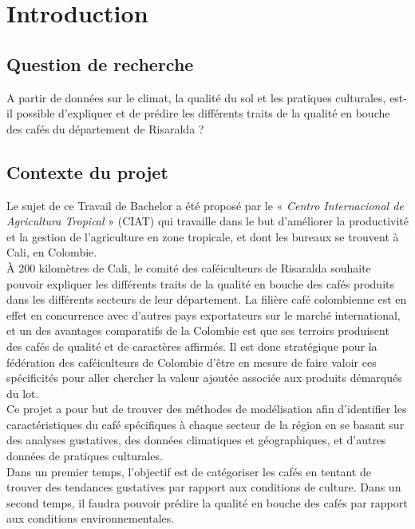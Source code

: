 
\chapter{Introduction}
\section{Question de recherche}

A partir de données sur le climat, la qualité du sol et les pratiques culturales, est-il possible d’expliquer et de prédire les différents traits de la qualité en bouche des cafés du département de Risaralda ?


\section{Contexte du projet}
Le sujet de ce Travail de Bachelor a été proposé par le « \textit{Centro Internacional de Agricultura Tropical }» (CIAT) qui travaille dans le but d’améliorer la productivité et la gestion de l’agriculture en zone tropicale, et dont les bureaux se trouvent à Cali, en Colombie.\\

\noindent À 200 kilomètres de Cali, le comité des caféiculteurs de Risaralda souhaite pouvoir expliquer les différents traits de la qualité en bouche des cafés produits dans les différents secteurs de leur département. La filière café colombienne est en effet en concurrence avec d’autres pays exportateurs sur le marché international, et un des avantages comparatifs de la Colombie est que ses terroirs produisent des cafés de qualité et de caractères affirmés. Il est donc stratégique pour la fédération des caféiculteurs de Colombie d'être en mesure de faire valoir ces spécificités pour aller chercher la valeur ajoutée associée aux produits démarqués du lot.\\


\noindent Ce projet a pour but de trouver des méthodes de modélisation afin d’identifier les caractéristiques du café spécifiques à chaque secteur de la région en se basant sur des analyses gustatives, des données climatiques et géographiques, et d’autres données de pratiques culturales.\\


\noindent Dans un premier temps, l’objectif est de catégoriser les cafés en tentant de trouver des tendances gustatives par rapport aux conditions de culture. Dans un second temps, il faudra pouvoir prédire la qualité en bouche des cafés par rapport aux conditions environnementales.\\


